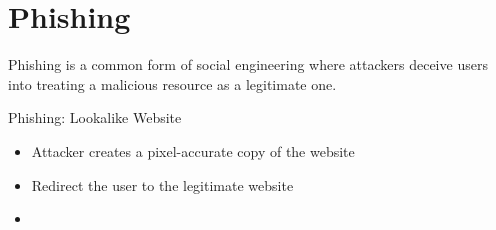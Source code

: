 \chapter{Phishing}

\begin{dfnbox}{Phishing}{}
     is a common form of social engineering where attackers deceive users into treating a malicious resource as a legitimate one.
\end{dfnbox}

\begin{tecbox}{Phishing: Lookalike Website}{}
    \begin{itemize}
        \item Attacker creates a pixel-accurate copy of the website
        \item Redirect the user to the legitimate website
        \item 
    \end{itemize}
\end{tecbox}
